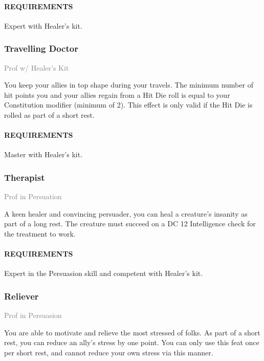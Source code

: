     \paragraph{REQUIREMENTS} Expert with Healer's kit.

    \subsubsection{Travelling Doctor} \label{feat::travellingdoctor}
    \small{\textcolor{gray}{Prof w/ Healer's Kit}}

    \normalsize
    You keep your allies in top shape during your travels.
    The minimum number of hit points you and your allies regain from a Hit Die roll is equal to your Constitution modifier (minimum of 2).
    This effect is only valid if the Hit Die is rolled as part of a short rest.
    \paragraph{REQUIREMENTS} Master with Healer's kit.

    \subsubsection{Therapist} \label{feat::therapist}
    \small{\textcolor{gray}{Prof in Persuation}}

    \normalsize
    A keen healer and convincing persuader, you can heal a creature's insanity as part of a long rest.
    The creature must succeed on a DC 12 Intelligence check for the treatment to work.
    \paragraph{REQUIREMENTS} Expert in the Persuasion skill and competent with Healer's kit.

\subsubsection{Reliever} \label{feat::reliever}
\small{\textcolor{gray}{Prof in Persuasion}}

\normalsize
You are able to motivate and relieve the most stressed of folks.
As part of a short rest, you can reduce an ally's stress by one point.
You can only use this feat once per short rest, and cannot reduce your own stress via this manner.
